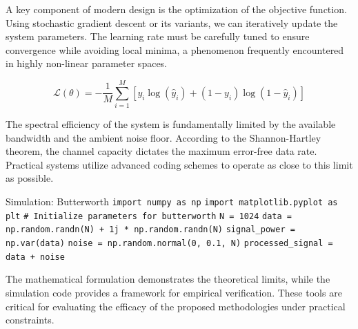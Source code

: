 A key component of modern design is the optimization of the objective function. Using stochastic gradient descent or its variants, we can iteratively update the system parameters. The learning rate must be carefully tuned to ensure convergence while avoiding local minima, a phenomenon frequently encountered in highly non-linear parameter spaces.

\begin{equation}
    \mathcal{L}(\theta) = -\frac{1}{M} \sum_{i=1}^{M} \left[ y_i \log(\hat{y}_i) + (1-y_i)\log(1-\hat{y}_i) \right]
\end{equation}

The spectral efficiency of the system is fundamentally limited by the available bandwidth and the ambient noise floor. According to the Shannon-Hartley theorem, the channel capacity dictates the maximum error-free data rate. Practical systems utilize advanced coding schemes to operate as close to this limit as possible.

\begin{pythonbox}{Simulation: Butterworth}
\texttt{import numpy as np}
\texttt{import matplotlib.pyplot as plt}
\texttt{}
\texttt{\# Initialize parameters for butterworth}
\texttt{N = 1024}
\texttt{data = np.random.randn(N) + 1j * np.random.randn(N)}
\texttt{signal\_power = np.var(data)}
\texttt{noise = np.random.normal(0, 0.1, N)}
\texttt{processed\_signal = data + noise}
\end{pythonbox}

\vspace{0.5cm}
The mathematical formulation demonstrates the theoretical limits, while the simulation code provides a framework for empirical verification. These tools are critical for evaluating the efficacy of the proposed methodologies under practical constraints.

